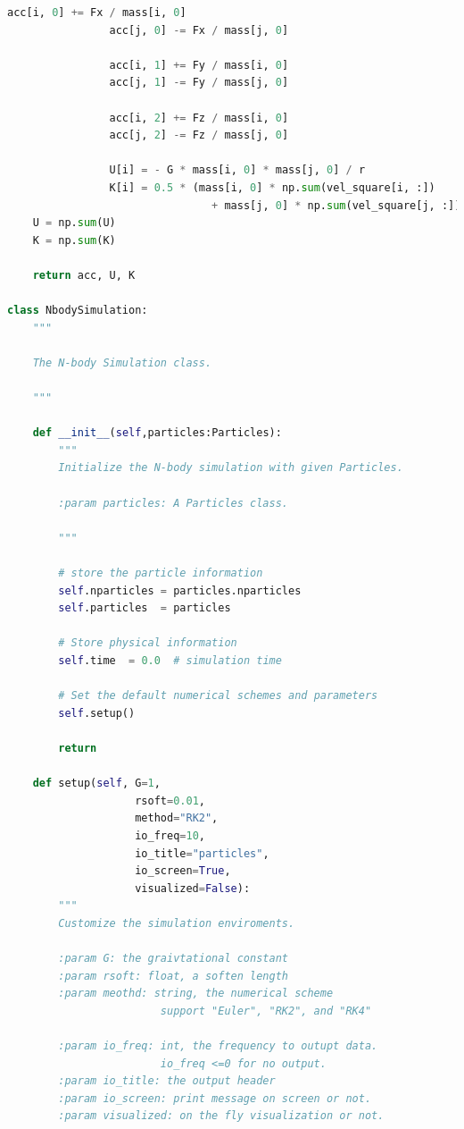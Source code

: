 \documentclass[12pt]{article}
\begin{document}
\begin{lstlisting}[language={Python}]
                acc[i, 0] += Fx / mass[i, 0]
                acc[j, 0] -= Fx / mass[j, 0]

                acc[i, 1] += Fy / mass[i, 0]
                acc[j, 1] -= Fy / mass[j, 0]
                
                acc[i, 2] += Fz / mass[i, 0]
                acc[j, 2] -= Fz / mass[j, 0]
                
                U[i] = - G * mass[i, 0] * mass[j, 0] / r
                K[i] = 0.5 * (mass[i, 0] * np.sum(vel_square[i, :]) 
                                + mass[j, 0] * np.sum(vel_square[j, :]))
    U = np.sum(U)
    K = np.sum(K)
    
    return acc, U, K

class NbodySimulation:
    """
    
    The N-body Simulation class.
    
    """
    
    def __init__(self,particles:Particles):
        """
        Initialize the N-body simulation with given Particles.

        :param particles: A Particles class.  
        
        """

        # store the particle information
        self.nparticles = particles.nparticles
        self.particles  = particles

        # Store physical information
        self.time  = 0.0  # simulation time

        # Set the default numerical schemes and parameters
        self.setup()
        
        return

    def setup(self, G=1, 
                    rsoft=0.01, 
                    method="RK2", 
                    io_freq=10, 
                    io_title="particles",
                    io_screen=True,
                    visualized=False):
        """
        Customize the simulation enviroments.

        :param G: the graivtational constant
        :param rsoft: float, a soften length
        :param meothd: string, the numerical scheme
                        support "Euler", "RK2", and "RK4"

        :param io_freq: int, the frequency to outupt data.
                        io_freq <=0 for no output. 
        :param io_title: the output header
        :param io_screen: print message on screen or not.
        :param visualized: on the fly visualization or not. 
        

\end{lstlisting}
\end{document}
